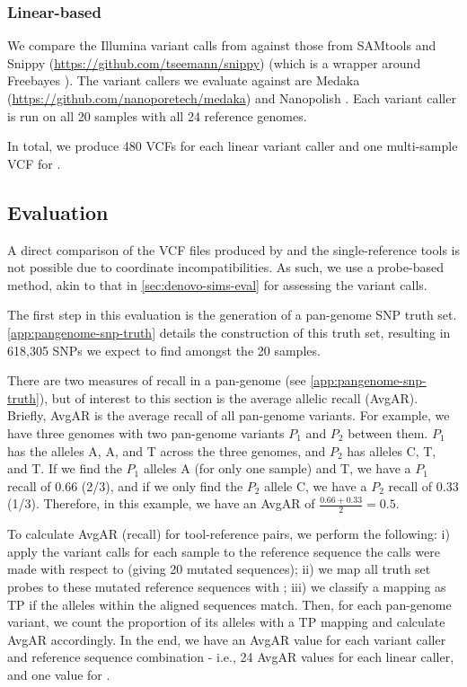 \subsubsection{Linear-based}
We compare the Illumina variant calls from \pandora{} against those from SAMtools \cite{samtools2009} and Snippy (\url{https://github.com/tseemann/snippy}) (which is a wrapper around Freebayes \cite{Garrison2012}). The \ont{} variant callers we evaluate against are Medaka (\url{https://github.com/nanoporetech/medaka}) and Nanopolish \cite{Loman2015}. Each variant caller is run on all 20 samples with all 24 reference genomes. 

\noindent
In total, we produce 480 VCFs for each linear variant caller and one multi-sample VCF for \pandora{}.

\subsection{Evaluation}
\label{sec:denovo-empirical-eval}

A direct comparison of the VCF files produced by \pandora{} and the single-reference tools is not possible due to coordinate incompatibilities. As such, we use a probe-based method, akin to that in \autoref{sec:denovo-sims-eval} for assessing the variant calls. 

The first step in this evaluation is the generation of a pan-genome SNP truth set. \autoref{app:pangenome-snp-truth} details the construction of this truth set, resulting in 618,305 SNPs we expect to find amongst the 20 samples.

There are two measures of recall in a pan-genome (see \autoref{app:pangenome-snp-truth}), but of interest to this section is the average allelic recall (AvgAR). Briefly, AvgAR is the average recall of all pan-genome variants. For example, we have three genomes with two pan-genome variants $P_1$ and $P_2$ between them. $P_1$ has the alleles A, A, and T across the three genomes, and $P_2$ has alleles C, T, and T. If we find the $P_1$ alleles A (for only one sample) and T, we have a $P_1$ recall of 0.66 (2/3), and if we only find the $P_2$ allele C, we have a $P_2$ recall of 0.33 (1/3). Therefore, in this example, we have an AvgAR of $\frac{0.66+0.33}{2}=0.5$.

To calculate AvgAR (recall) for tool-reference pairs, we perform the following: i) apply the variant calls for each sample to the reference sequence the calls were made with respect to (giving 20 mutated sequences); ii) we map all truth set probes to these mutated reference sequences with ; iii) we classify a mapping as TP if the alleles within the aligned sequences match. Then, for each pan-genome variant, we count the proportion of its alleles with a TP mapping and calculate AvgAR accordingly. In the end, we have an AvgAR value for each variant caller and reference sequence combination - i.e., 24 AvgAR values for each linear caller, and one value for \pandora{}.

